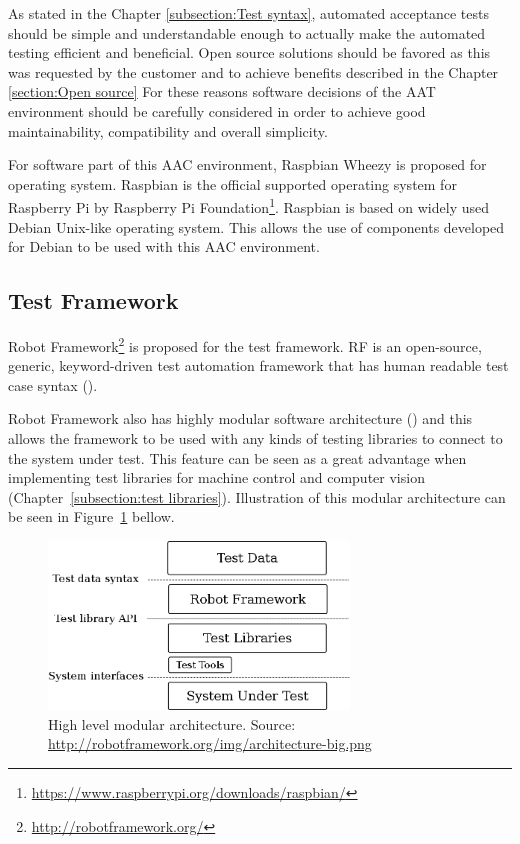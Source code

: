 As stated in the Chapter \ref{subsection:Test syntax}, automated acceptance tests should be simple and understandable enough to actually make the automated testing efficient and beneficial. Open source solutions should be favored as this was requested by the customer and to achieve benefits described in the Chapter \ref{section:Open source} For these reasons software decisions of the AAT environment should be carefully considered in order to achieve good maintainability, compatibility and overall simplicity.

For software part of this AAC environment, Raspbian Wheezy is proposed for operating system. Raspbian is the official supported operating system for Raspberry Pi by Raspberry Pi Foundation\footnote{\url{https://www.raspberrypi.org/downloads/raspbian/}}. Raspbian is based on widely used Debian Unix-like operating system. This allows the use of components developed for Debian to be used with this AAC environment.

\FloatBarrier
\subsection{Test Framework}
\label{subsection:test framework}

Robot Framework\footnote{\url{http://robotframework.org/}} is proposed for the test framework. RF is an open-source, generic, keyword-driven test automation framework that has human readable test case syntax (\emph{\cite{Rfuserguide}}).

Robot Framework also has highly modular software architecture (\emph{\cite{Rfuserguide}}) and this allows the framework to be used with any kinds of testing libraries to connect to the system under test. This feature can be seen as a great advantage when implementing test libraries for machine control and computer vision (Chapter~\ref{subsection:test libraries}). Illustration of this modular architecture can be seen in Figure~\ref{fig:modular_architecture} bellow.

\begin{figure}[ht]
  \begin{center}
    \includegraphics[width=8cm]{images/architecture-big.png}
    \caption{High level modular architecture. Source: \url{http://robotframework.org/img/architecture-big.png}}
    \label{fig:modular_architecture}
  \end{center}
\end{figure}

